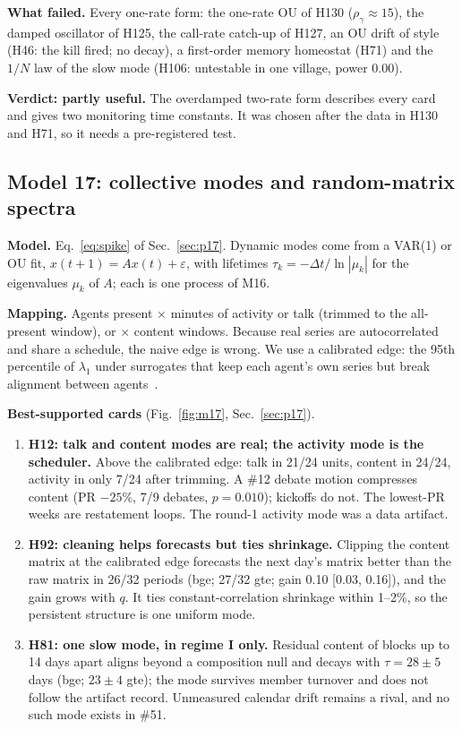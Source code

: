 \textbf{What failed.} Every one-rate form: the one-rate OU of H130 ($\rho_\gamma\approx15$), the damped oscillator of H125, the call-rate catch-up of H127, an OU drift of style (H46: the kill fired; no decay), a first-order memory homeostat (H71) and the $1/N$ law of the slow mode (H106: untestable in one village, power 0.00).

\textbf{Verdict: partly useful.} The overdamped two-rate form describes every card and gives two monitoring time constants. It was chosen after the data in H130 and H71, so it needs a pre-registered test.

\subsection{Model 17: collective modes and random-matrix spectra}\label{sec:m17}

\textbf{Model.} Eq.~\eqref{eq:spike} of Sec.~\ref{sec:p17}. Dynamic modes come from a VAR(1) or OU fit, $x(t+1)=Ax(t)+\varepsilon$, with lifetimes $\tau_k=-\Delta t/\ln|\mu_k|$ for the eigenvalues $\mu_k$ of $A$; each is one process of M16.

\textbf{Mapping.} Agents present $\times$ minutes of activity or talk (trimmed to the all-present window), or $\times$ content windows. Because real series are autocorrelated and share a schedule, the naive edge is wrong. We use a calibrated edge: the 95th percentile of $\lambda_1$ under surrogates that keep each agent's own series but break alignment between agents~\cite{laloux1999}.

\textbf{Best-supported cards} (Fig.~\ref{fig:m17}, Sec.~\ref{sec:p17}).
\begin{enumerate}
\item \textbf{H12: talk and content modes are real; the activity mode is the scheduler.} Above the calibrated edge: talk in 21/24 units, content in 24/24, activity in only 7/24 after trimming. A \#12 debate motion compresses content (PR $-25\%$, 7/9 debates, $p=0.010$); kickoffs do not. The lowest-PR weeks are restatement loops. The round-1 activity mode was a data artifact.
\item \textbf{H92: cleaning helps forecasts but ties shrinkage.} Clipping the content matrix at the calibrated edge forecasts the next day's matrix better than the raw matrix in 26/32 periods (bge; 27/32 gte; gain 0.10 [0.03, 0.16]), and the gain grows with $q$. It ties constant-correlation shrinkage within 1--2\%, so the persistent structure is one uniform mode.
\item \textbf{H81: one slow mode, in regime I only.} Residual content of blocks up to 14 days apart aligns beyond a composition null and decays with $\tau=28\pm5$ days (bge; $23\pm4$ gte); the mode survives member turnover and does not follow the artifact record. Unmeasured calendar drift remains a rival, and no such mode exists in \#51.
\end{enumerate}

